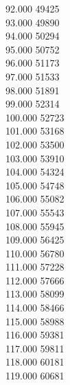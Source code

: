 { 92.000	49425 \\
 93.000	49890 \\
 94.000	50294 \\
 95.000	50752 \\
 96.000	51173 \\
 97.000	51533 \\
 98.000	51891 \\
 99.000	52314 \\
 100.000	52723 \\
 101.000	53168 \\
 102.000	53500 \\
 103.000	53910 \\
 104.000	54324 \\
 105.000	54748 \\
 106.000	55082 \\
 107.000	55543 \\
 108.000	55945 \\
 109.000	56425 \\
 110.000	56780 \\
 111.000	57228 \\
 112.000	57666 \\
 113.000	58099 \\
 114.000	58466 \\
 115.000	58988 \\
 116.000	59381 \\
 117.000	59811 \\
 118.000	60181 \\
 119.000	60681 \\
}

